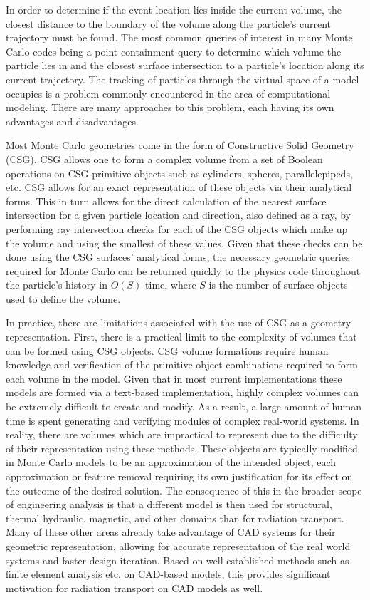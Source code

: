 \documentclass[12pt, a4paper]{article}
\begin{document}
In order to determine if the event location lies inside the current volume, the closest distance to the boundary of the volume along the particle's current trajectory must be found. The most common queries of interest in many Monte Carlo codes being a point containment query to determine which volume the particle lies in and the closest surface intersection to a particle's location along its current trajectory. The tracking of particles through the virtual space of a model occupies is a problem commonly encountered in the area of computational modeling. There are many approaches to this problem, each having its own advantages and disadvantages.

Most Monte Carlo geometries come in the form of Constructive Solid Geometry (CSG). CSG allows one to form a complex volume from a set of Boolean operations on CSG primitive objects such as cylinders, spheres, parallelepipeds, etc. CSG allows for an exact representation of these objects via their analytical forms. This in turn allows for the direct calculation of the nearest surface intersection for a given particle location and direction, also defined as a ray, by performing ray intersection checks for each of the CSG objects which make up the volume and using the smallest of these values. Given that these checks can be done using the CSG surfaces' analytical forms, the necessary geometric queries required for Monte Carlo can be returned quickly to the physics code throughout the particle's history in $O(S)$ time, where $S$ is the number of surface objects used to define the volume.

In practice, there are limitations associated with the use of CSG as a geometry representation. First, there is a practical limit to the complexity of volumes that can be formed using CSG objects. CSG volume formations require human knowledge and verification of the primitive object combinations required to form each volume in the model. Given that in most current implementations these models are formed via a text-based implementation, highly complex volumes can be extremely difficult to create and modify. As a result, a large amount of human time is spent generating and verifying modules of complex real-world systems. In reality, there are volumes which are impractical to represent due to the difficulty of their representation using these methods. These objects are typically modified in Monte Carlo models to be an approximation of the intended object, each approximation or feature removal requiring its own justification for its effect on the outcome of the desired solution. The consequence of this in the broader scope of engineering analysis is that a different model is then used for structural, thermal hydraulic, magnetic, and other domains than for radiation transport. Many of these other areas already take advantage of CAD systems for their geometric representation, allowing for accurate representation of the real world systems and faster design iteration. Based on well-established methods such as finite element analysis etc. on CAD-based models, this provides significant motivation for radiation transport on CAD models as well.
\end{document}
